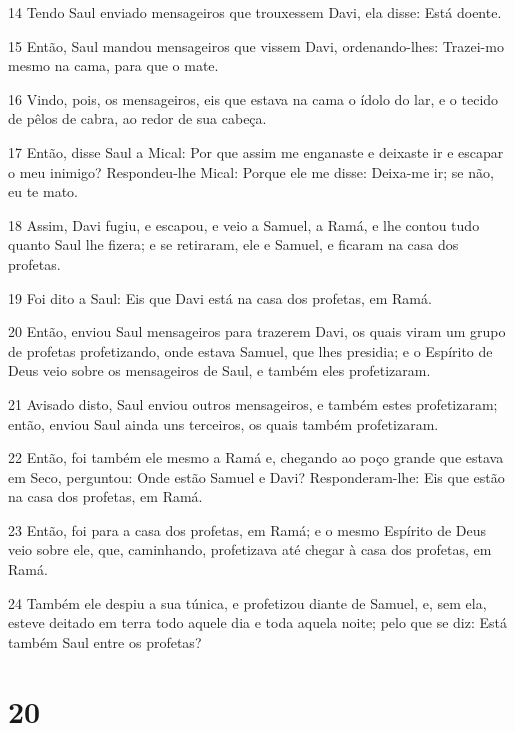 \par 14 Tendo Saul enviado mensageiros que trouxessem Davi, ela disse: Está doente.
\par 15 Então, Saul mandou mensageiros que vissem Davi, ordenando-lhes: Trazei-mo mesmo na cama, para que o mate.
\par 16 Vindo, pois, os mensageiros, eis que estava na cama o ídolo do lar, e o tecido de pêlos de cabra, ao redor de sua cabeça.
\par 17 Então, disse Saul a Mical: Por que assim me enganaste e deixaste ir e escapar o meu inimigo? Respondeu-lhe Mical: Porque ele me disse: Deixa-me ir; se não, eu te mato.
\par 18 Assim, Davi fugiu, e escapou, e veio a Samuel, a Ramá, e lhe contou tudo quanto Saul lhe fizera; e se retiraram, ele e Samuel, e ficaram na casa dos profetas.
\par 19 Foi dito a Saul: Eis que Davi está na casa dos profetas, em Ramá.
\par 20 Então, enviou Saul mensageiros para trazerem Davi, os quais viram um grupo de profetas profetizando, onde estava Samuel, que lhes presidia; e o Espírito de Deus veio sobre os mensageiros de Saul, e também eles profetizaram.
\par 21 Avisado disto, Saul enviou outros mensageiros, e também estes profetizaram; então, enviou Saul ainda uns terceiros, os quais também profetizaram.
\par 22 Então, foi também ele mesmo a Ramá e, chegando ao poço grande que estava em Seco, perguntou: Onde estão Samuel e Davi? Responderam-lhe: Eis que estão na casa dos profetas, em Ramá.
\par 23 Então, foi para a casa dos profetas, em Ramá; e o mesmo Espírito de Deus veio sobre ele, que, caminhando, profetizava até chegar à casa dos profetas, em Ramá.
\par 24 Também ele despiu a sua túnica, e profetizou diante de Samuel, e, sem ela, esteve deitado em terra todo aquele dia e toda aquela noite; pelo que se diz: Está também Saul entre os profetas?

\chapter{20}

